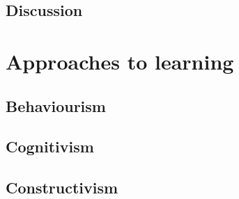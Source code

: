\subsection{Discussion}

\section{Approaches to learning}


\subsection{Behaviourism}

\subsection{Cognitivism}

\subsection{Constructivism}
